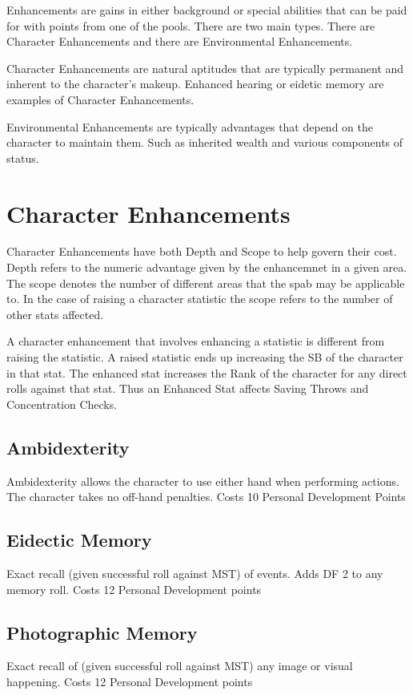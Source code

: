 Enhancements are gains in either background or special abilities that
can be paid for with points from one of the pools. There are two main
types. There are Character Enhancements and there are
Environmental Enhancements.

Character Enhancements are natural aptitudes that are typically 
permanent and inherent to the character's makeup. Enhanced hearing or
eidetic memory are examples of Character Enhancements.

Environmental Enhancements are typically advantages that depend on  the
character to maintain them. Such as inherited wealth and various components 
of status.

\section{Character Enhancements}

Character Enhancements have both Depth and Scope to help govern their cost.
Depth refers to the numeric advantage given by the enhancemnet in a given
area. The scope denotes the number of different areas that the spab
may be applicable to. In the case of raising a character statistic the 
scope refers to the number of other stats affected.

A character enhancement that involves enhancing a statistic is different from 
raising the statistic. A raised statistic ends up increasing the SB of the 
character in that stat. The enhanced stat increases the Rank of the 
character for any direct rolls against that stat. Thus an Enhanced Stat
affects Saving Throws and Concentration Checks.

\subsection{Ambidexterity}
Ambidexterity allows the character to use either hand when performing 
actions. The character takes no off-hand penalties.
Costs 10 Personal Development Points

\subsection{Eidectic Memory}
Exact recall (given successful roll against MST) of events. Adds DF 2 to any
memory roll.
Costs 12 Personal Development points

\subsection{Photographic Memory}
Exact recall of (given successful roll against MST) any image or visual
happening.
Costs 12 Personal Development points

